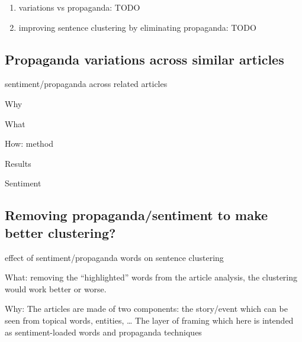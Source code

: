 \begin{enumerate}
    \item variations vs propaganda: TODO
    \item improving sentence clustering by eliminating propaganda: TODO
\end{enumerate}

\subsection{\statusred Propaganda variations across similar articles}

sentiment/propaganda across related articles

Why

What

How: method

Results


Sentiment


\subsection{\statusorange Removing propaganda/sentiment to make better clustering?}

effect of sentiment/propaganda words on sentence clustering

What: removing the “highlighted” words from the article analysis, the clustering would work better or worse.

Why:
The articles are made of two components:
the story/event which can be seen from topical words, entities, …
The layer of framing which here is intended as sentiment-loaded words and propaganda techniques

